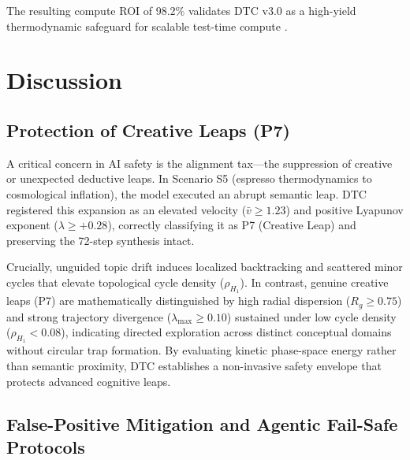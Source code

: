 \documentclass[11pt,a4paper]{article}
\begin{document}
The resulting compute ROI of 98.2\% validates DTC v3.0 as a high-yield thermodynamic safeguard for scalable test-time compute \cite{snell2024scaling}.

\section{Discussion}

\subsection{Protection of Creative Leaps (P7)}

A critical concern in AI safety is the alignment tax---the suppression of creative or unexpected deductive leaps. In Scenario S5 (espresso thermodynamics to cosmological inflation), the model executed an abrupt semantic leap. DTC registered this expansion as an elevated velocity ($\bar{v} \ge 1.23$) and positive Lyapunov exponent ($\lambda \ge +0.28$), correctly classifying it as P7 (Creative Leap) and preserving the 72-step synthesis intact.

Crucially, unguided topic drift induces localized backtracking and scattered minor cycles that elevate topological cycle density ($\rho_{H_1}$). In contrast, genuine creative leaps (P7) are mathematically distinguished by high radial dispersion ($R_g \ge 0.75$) and strong trajectory divergence ($\lambda_{\max} \ge 0.10$) sustained under low cycle density ($\rho_{H_1} < 0.08$), indicating directed exploration across distinct conceptual domains without circular trap formation. By evaluating kinetic phase-space energy rather than semantic proximity, DTC establishes a non-invasive safety envelope that protects advanced cognitive leaps.

\subsection{False-Positive Mitigation and Agentic Fail-Safe Protocols}
\end{document}
